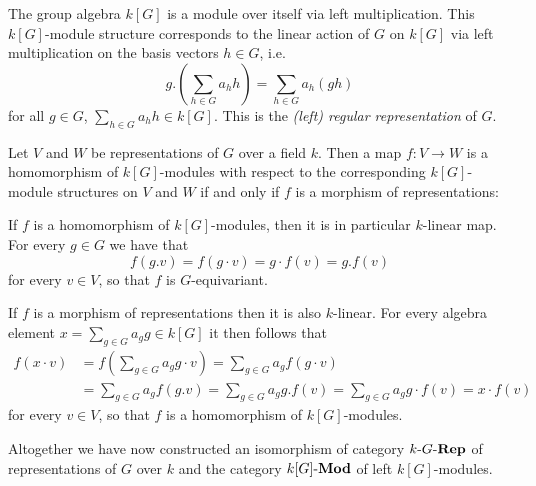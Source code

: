 \begin{definition}
  The group algebra $k[G]$ is a module over itself via left multiplication.
  This $k[G]$-module structure corresponds to the linear action of $G$ on $k[G]$ via left multiplication on the basis vectors $h \in G$, i.e.
  \[
      g.\left( \sum_{h \in G} a_h h \right)
    = \sum_{h \in G} a_h (gh)
  \]
  for all $g \in G$, $\sum_{h \in G} a_h h \in k[G]$.
  This is the \emph{\textup(left\textup) regular representation} of $G$.
\end{definition}


\begin{remark}
  Let $V$ and $W$ be representations of $G$ over a field $k$.
  Then a map $f \colon V \to W$ is a homomorphism of $k[G]$-modules with respect to the corresponding $k[G]$-module structures on $V$ and $W$ if and only if $f$ is a morphism of representations:
  
  If $f$ is a homomorphism of $k[G]$-modules, then it is in particular $k$-linear map.
  For every $g \in G$ we have that
  \[
      f(g.v)
    = f(g \cdot v)
    = g \cdot f(v)
    = g.f(v)
  \]
  for every $v \in V$, so that $f$ is $G$-equivariant.
  
  If $f$ is a morphism of representations then it is also $k$-linear.
  For every algebra element $x = \sum_{g \in G} a_g g \in k[G]$ it then follows that
  \begin{align*}
        f(x \cdot v)
    &=  f\left( \sum_{g \in G} a_g g \cdot v \right)
     =  \sum_{g \in G} a_g f(g \cdot v) \\
    &=  \sum_{g \in G} a_g f(g.v)
     =  \sum_{g \in G} a_g g.f(v)
     =  \sum_{g \in G} a_g g \cdot f(v)
     =  x \cdot f(v)
  \end{align*}
  for every $v \in V$, so that $f$ is a homomorphism of $k[G]$-modules.
  
  Altogether we have now constructed an isomorphism of category $k\text{-}G\text{-}\mathbf{Rep}$ of representations of $G$ over $k$ and the category $k[G]\text{-}\mathbf{Mod}$ of left $k[G]$-modules.
\end{remark}


